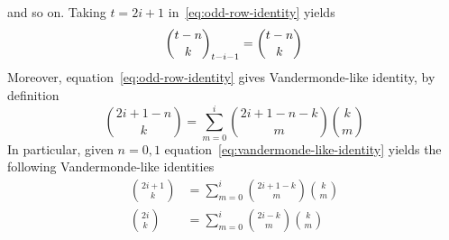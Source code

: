 and so on.
Taking $t=2i+1$ in~\eqref{eq:odd-row-identity} yields
\begin{align*}
    \binom{t-n}{k}_{t-i-1}= \binom{t-n}{k}
\end{align*}
Moreover, equation~\eqref{eq:odd-row-identity} gives Vandermonde-like identity, by definition
\begin{equation}
    \binom{2i+1-n}{k} = \sum_{m=0}^{i} \binom{2i+1-n-k}{m} \binom{k}{m}
    \label{eq:vandermonde-like-identity}
\end{equation}
In particular, given $n=0,1$ equation~\eqref{eq:vandermonde-like-identity}
yields the following Vandermonde-like identities
\begin{align*}
    \binom{2i+1}{k} &= \sum_{m=0}^{i} \binom{2i+1-k}{m} \binom{k}{m} \\
    \binom{2i}{k}   &= \sum_{m=0}^{i} \binom{2i-k}{m} \binom{k}{m}
\end{align*}
